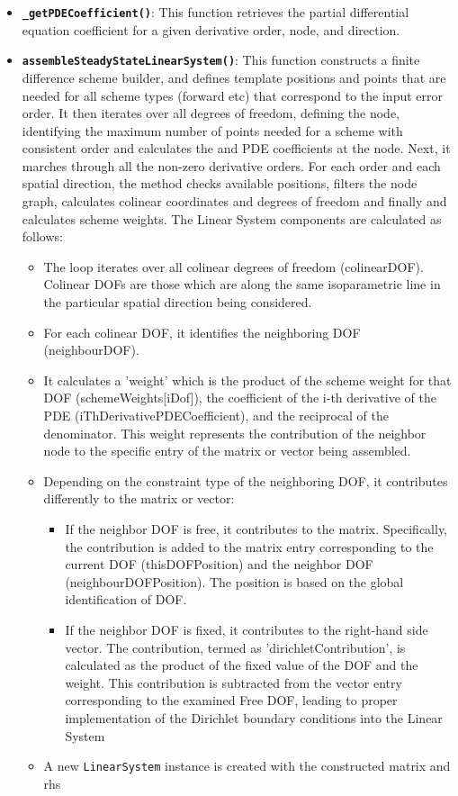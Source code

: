\documentclass{article}
\begin{document}
\begin{itemize}
\begin{itemize}
 				\item \textbf{\texttt{\_getPDECoefficient()}}: This function retrieves the partial differential equation coefficient for a given derivative order, node, and direction.
 					\item \textbf{\texttt{assembleSteadyStateLinearSystem()}}: This function constructs a finite difference scheme builder, and defines template positions and points that are needed for all scheme types (forward etc) that correspond to the input error order. It then iterates over all degrees of freedom, defining the node, identifying the maximum number of points needed for a scheme with consistent order and calculates the  and PDE coefficients at the node. Next, it marches through all the non-zero derivative orders. For each order and each spatial direction, the method checks available positions, filters the node graph, calculates colinear coordinates and degrees of freedom and finally and calculates scheme weights. The Linear System components are calculated as follows:
 				\begin{itemize}
 					\item The loop iterates over all colinear degrees of freedom (colinearDOF). Colinear DOFs are those which are along the same isoparametric line in the particular spatial direction being considered.
 					\item For each colinear DOF, it identifies the neighboring DOF (neighbourDOF).
 					\item It calculates a 'weight' which is the product of the scheme weight for that DOF (schemeWeights[iDof]), the coefficient of the i-th derivative of the PDE (iThDerivativePDECoefficient), and the reciprocal of the denominator. This weight represents the contribution of the neighbor node to the specific entry of the matrix or vector being assembled.
 					\item Depending on the constraint type of the neighboring DOF, it contributes differently to the matrix or vector:
 					\begin{itemize}
 						\item If the neighbor DOF is free, it contributes to the matrix. Specifically, the contribution is added to the matrix entry corresponding to the current DOF (thisDOFPosition) and the neighbor DOF (neighbourDOFPosition). The position is based on the global identification of DOF.
 						\item If the neighbor DOF is fixed, it contributes to the right-hand side vector. The contribution, termed as 'dirichletContribution', is calculated as the product of the fixed value of the DOF and the weight. This contribution is subtracted from the vector entry corresponding to the examined Free DOF, leading to proper implementation of the Dirichlet boundary conditions into the Linear System
 					\end{itemize}
 					\item A new \texttt{LinearSystem} instance is created with the constructed matrix and rhs
 			\end{itemize}
 			

\end{itemize}
\end{itemize}
\end{document}
